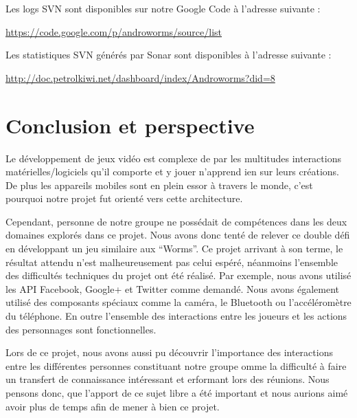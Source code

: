 \documentclass{report}
\begin{document}
Les logs SVN sont disponibles sur notre Google Code à l’adresse suivante :

\url{https://code.google.com/p/androworms/source/list}

\bigskip

Les statistiques SVN générés par Sonar sont disponibles à l’adresse suivante :

\url{http://doc.petrolkiwi.net/dashboard/index/Androworms?did=8}


\newpage

\section{Conclusion et perspective}
\bigskip


Le développement de jeux vidéo est complexe de par les multitudes
interactions matérielles/logiciels qu’il comporte et y jouer n’apprend
ien sur leurs créations. De plus les appareils mobiles sont en plein
essor à travers le monde, c’est pourquoi notre projet fut orienté vers
cette architecture.

Cependant, personne de notre groupe ne possédait de compétences dans
les deux domaines explorés dans ce projet. Nous avons donc tenté de
relever ce double défi en développant un jeu similaire aux “Worms”.
Ce projet arrivant à son terme, le résultat attendu n’est
malheureusement pas celui espéré, néanmoins l’ensemble des difficultés
techniques du projet ont été réalisé. Par exemple, nous avons utilisé
les API Facebook, Google+ et Twitter comme demandé. Nous avons également
utilisé des composants spéciaux comme la caméra, le Bluetooth ou
l’accéléromètre du téléphone. En outre l’ensemble des interactions entre
les joueurs et les actions des personnages sont fonctionnelles. 

Lors de ce projet, nous avons aussi pu découvrir l’importance des
interactions entre les différentes personnes constituant notre groupe
omme la difficulté à faire un transfert de connaissance intéressant et
erformant lors des réunions. Nous pensons donc, que l’apport de ce sujet
libre a été important et nous aurions aimé avoir plus de temps afin de
mener à bien ce projet.
\end{document}

